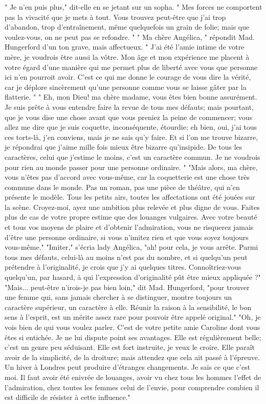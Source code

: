 " Je n’en puis plus," dit-elle en se jetant sur un sopha. " Mes forces ne comportent pas la vivacité que je mets à tout. Vous trouvez peut-être que j’ai trop d’abandon, trop\setcounter{page}{537} d'entraînement, même quelquefois un grain de folie; mais que voulez-vous, on ne peut pas se refondre. "
" Ma chère Angélica, " répondit Mad. Hungerford d'un ton grave, mais affectueux. " J'ai été l'amie intime de votre mère, je voudrois être aussi la vôtre. Mon âge et mon expérience me placent à votre égard d'une manière qui me permet plus de liberté avec vous que personne ici n'en pourroit avoir. C'est ce qui me donne le courage de vous dire la vérité, car je déplore sincèrement qu'une personne comme vous se laisse gâter par la flatterie. "
" Eh, mon Dieu! ma chère madame, vous êtes bien bonne assurément. Je suis prête à vous entendre faire la revue de tous mes défauts; mais pourtant, que je vous dise une chose avant que vous preniez la peine de commencer; vous allez me dire que je suis coquette, inconséquente, étourdie; eh bien, oui, j'ai tous ces torts-là, j'en conviens, mais je ne sais qu'y faire. Et si l'on me trouve bizarre, je répondrai que j'aime mille fois mieux être bizarre qu'insipide. De tous les caractères, celui que j'estime le moins, c'est un caractère commun. Je ne voudrois pour rien au monde passer pour une personne ordinaire. "\setcounter{page}{538} "Mais alors, ma chère, vous n’êtes pas d’accord avec vous-même, car la coquetterie est une chose très commune dans le monde. Pas un roman, pas une pièce de théâtre, qui n’en présente le modèle. Tous les petits airs, toutes les affectations ont été jouées sur la scène. Croyez-moi, ayez une ambition plus relevée et plus digne de vous. Faites plus de cas de votre propre estime que des louanges vulgaires. Avec votre beauté et tous vos moyens de plaire et d’obtenir l’admiration, vous ne risquerez jamais d’être une personne ordinaire, si vous n’imitez rien et que vous soyez toujours vous-même."
"Imiter," s’écria lady Angélica, "ah! pour cela, je vous arrête. Parmi tous mes défauts, celui-là au moins n’est pas du nombre, et si quelqu’un peut prétendre à l’originalité, je crois que j’y ai quelques titres. Connoîtriez-vous quelqu’un, par hasard, à qui l’expression d’originalité pût être mieux appliquée ?"
"Mais... peut-être n’irois-je pas bien loin," dit Mad. Hungerford, "pour trouver une femme qui, sans jamais chercher à se distinguer, montre toujours un caractère supérieur, un caractère à elle. Réunir la raison à la sensibilité, le bon sens à l’esprit, est un mérite assez rare pour pouvoir être appelé original."\setcounter{page}{539} "Oh, je vois bien de qui vous voulez parler. C'est de votre petite amie Caroline dont vous êtes si entichée. Je ne lui dispute point ses avantages. Elle est régulièrement belle; c'est un genre peu séduisant. Elle est fort instruite, je veux le croire. Elle paraît avoir de la simplicité, de la droiture; mais attendez que cela ait passé à l'épreuve. Un hiver à Londres peut produire d'étranges changements. Je sais ce que c'est moi. Il faut avoir été enivrée de louanges, avoir vu chez tous les hommes l'effet de l'admiration, chez toutes les femmes celui de l'envie, pour comprendre combien il est difficile de résister à cette influence."
